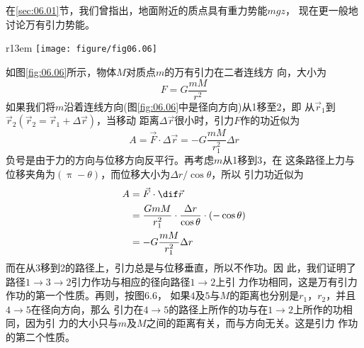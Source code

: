 \section[引力势能]{}\label{sec:06.03}

在\ref{sec:06.01}节，我们曾指出，地面附近的质点具有重力势能$ mgz $，
现在更一般地讨论万有引力势能。

\begin{wrapfigure}[10]{r}{13em}
  \vspace{-2em}
  \centering
  \texttt{[image: figure/fig06.06]}
  \caption{引力作的功}
  \label{fig:06.06}
\end{wrapfigure}
如图\ref{fig:06.06}所示，物体$ M $对质点$ m $的万有引力在二者连线方
向，大小为%
\begin{equation*}
  F = G \frac { m M } { r ^ { 2 } }
\end{equation*}
如果我们将$ m $沿着连线方向(图\ref{fig:06.06}\;中是径向方向)从1移至2，即
从$ \vec{r} _ 1 $到$ \vec{r} _ 2 \left( \vec{r} _ 2 = \vec{r} _ 1 + \Delta \vec{r} \right) $，当移动
距离$ \Delta \vec{r} $很小时，引力$ F $作的功近似为
\begin{equation*}
  A = \vec{F} \cdot \Delta \vec{r} = - G \frac { m M } { r _ 1 ^ { 2 } } \Delta r
\end{equation*}
负号是由于力的方向与位移方向反平行。再考虑$ m $从1移到3，在
这条路径上力与位移夹角为$ \left( \uppi - \theta \right) $，而位移大小为$ \Delta r / \cos \theta $，所以
引力功近似为
\begin{equation*}
  \begin{aligned}
    A & = \vec{F} \cdot \dif \vec{r}                                                                                        \\
      & = \frac { G m M } { r _ { 1 } ^ { 2 } } \cdot \frac { \Delta r } { \cos \theta } \cdot \left( - \cos \theta \right) \\
      & = - G \frac { m M } { r _ 1 ^ { 2 } } \Delta r
  \end{aligned}
\end{equation*}
而在从3移到2的路径上，引力总是与位移垂直，所以不作功。因
此，我们证明了路径$1 \to 3 \to 2$引力作功与相应的径向路径$ 1 \to 2 $上引
力作功相同，这是万有引力作功的第一个性质。再则，按图6.6，
如果$ 4 $及$ 5 $与$ M $的距离也分别是$ r_1 $，$ r_2 $，并且$ 4 \to 5 $在径向方向，那么
引力在$ 4 \to 5 $的路径上所作的功与在$ 1 \to 2 $上所作的功相同，因为引
力的大小只与$ m $及$ M $之间的距离有关，而与方向无关。这是引力
作功的第二个性质。

